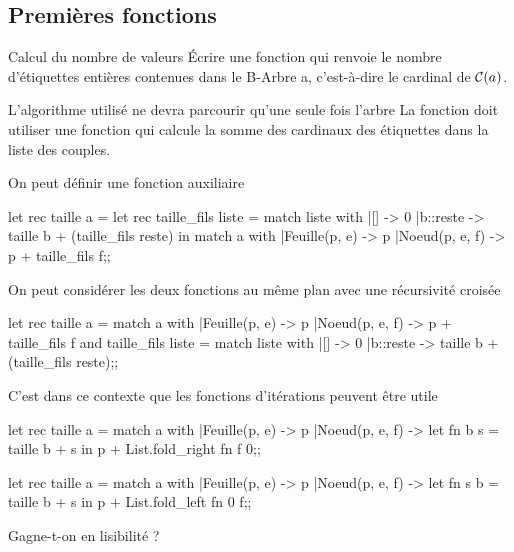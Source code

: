 \subsection{Premières fonctions}
\begin{question}{Calcul du nombre de valeurs}{}
Écrire une fonction  qui renvoie le nombre d’étiquettes entières contenues dans le B-Arbre a, c’est-à-dire le cardinal de ${\cal C}(a)$. 

L’algorithme utilisé ne devra parcourir qu’une seule fois l’arbre
\reponse
La fonction doit utiliser une fonction qui calcule la somme des cardinaux des étiquettes dans la liste des couples.

On peut définir une fonction auxiliaire
\begin{ocaml}
let rec taille a =
   let rec taille_fils liste =
      match liste with
      |[] -> 0
      |b::reste -> taille b + (taille_fils reste) in
   match a with
   |Feuille(p, e) -> p 
   |Noeud(p, e, f) -> p + taille_fils f;;  
\end{ocaml}

On peut considérer les deux fonctions au même plan avec une récursivité croisée
\begin{ocaml}
let rec taille a =
   match a with
   |Feuille(p, e) -> p 
   |Noeud(p, e, f) -> p + taille_fils f
and taille_fils liste =
    match liste with
    |[] -> 0
    |b::reste -> taille b + (taille_fils reste);;
\end{ocaml}

C'est dans ce contexte que les fonctions d'itérations peuvent être utile
\begin{ocaml}
let rec taille a =
   match a with
   |Feuille(p, e) -> p 
   |Noeud(p, e, f) -> let fn b s = taille b + s in 
                      p + List.fold_right fn f 0;;
\end{ocaml}

\begin{ocaml}
let rec taille a =
   match a with
   |Feuille(p, e) -> p 
   |Noeud(p, e, f) -> let fn s b = taille b + s in
                      p + List.fold_left fn 0 f;;
\end{ocaml}
Gagne-t-on en lisibilité ?
\end{question}

